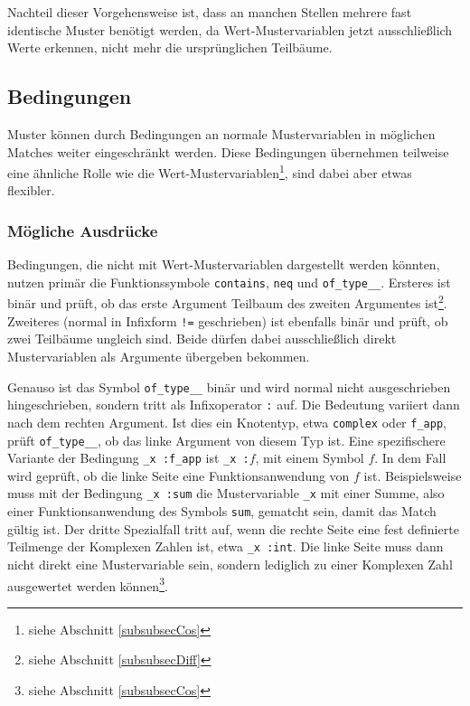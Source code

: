 Nachteil dieser Vorgehensweise ist, dass an manchen Stellen mehrere fast identische Muster benötigt werden, da Wert-Mustervariablen jetzt ausschließlich Werte erkennen, nicht mehr die ursprünglichen Teilbäume. 


\subsection{Bedingungen} \label{subsubsecBedingungen}

Muster können durch Bedingungen an normale Mustervariablen in möglichen Matches weiter eingeschränkt werden.
Diese Bedingungen übernehmen teilweise eine ähnliche Rolle wie die Wert-Mustervariablen\footnote{siehe Abschnitt \ref{subsubsecCos}}, sind dabei aber etwas flexibler. 


\subsubsection{Mögliche Ausdrücke}
Bedingungen, die nicht mit Wert-Mustervariablen dargestellt werden könnten, nutzen primär die Funktionssymbole \verb|contains|, \verb|neq| und \verb|of_type__|. Ersteres ist binär und prüft, ob das erste Argument Teilbaum des zweiten Argumentes ist\footnote{siehe Abschnitt \ref{subsubsecDiff}}. Zweiteres (normal in Infixform \verb|!=| geschrieben) ist ebenfalls binär und prüft, ob zwei Teilbäume ungleich sind. Beide dürfen dabei ausschließlich direkt Mustervariablen als Argumente übergeben bekommen. 

Genauso ist das Symbol \verb|of_type__| binär und wird normal nicht ausgeschrieben hingeschrieben, sondern tritt als Infixoperator \verb|:| auf. Die Bedeutung variiert dann nach dem rechten Argument. Ist dies ein Knotentyp, etwa \verb|complex| oder \verb|f_app|, prüft \verb|of_type__|, ob das linke Argument von diesem Typ ist. Eine spezifischere Variante der Bedingung \verb|_x :f_app| ist {\verb|_x :|$f$}, mit einem Symbol $f$. In dem Fall wird geprüft, ob die linke Seite eine Funktionsanwendung von $f$ ist. Beispielsweise muss mit der Bedingung \verb|_x :sum| die Mustervariable \verb|_x| mit einer Summe, also einer Funktionsanwendung des Symbols \verb|sum|, gematcht sein, damit das Match gültig ist.
Der dritte Spezialfall tritt auf, wenn die rechte Seite eine fest definierte Teilmenge der Komplexen Zahlen ist, etwa \verb|_x :int|. Die linke Seite muss dann nicht direkt eine Mustervariable sein, sondern lediglich zu einer Komplexen Zahl ausgewertet werden können\footnote{siehe Abschnitt \ref{subsubsecCos}}.

